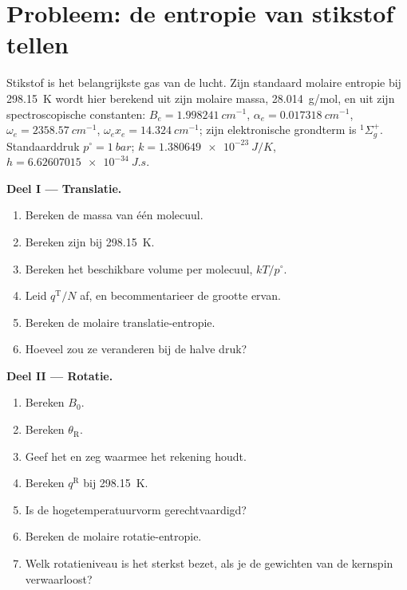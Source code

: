 \section{Probleem: de entropie van stikstof tellen}

\begin{problem}
\label{pb:b3:partition-functions:1}
Stikstof is het belangrijkste gas van de lucht. Zijn standaard molaire
entropie bij
\qty{298.15}{K} wordt hier berekend uit zijn molaire massa,
\qty{28.014}{g/mol}, en uit zijn spectroscopische constanten: $B_e = \qty{1.998241}{cm^{-1}}$, $\alpha_e = \qty{0.017318}{cm^{-1}}$, $\omega_e =
\qty{2358.57}{cm^{-1}}$, $\omega_ex_e = \qty{14.324}{cm^{-1}}$; zijn
elektronische grondterm is ${}^1\Sigma_g^+$.
Standaarddruk $p^\circ = \qty{1}{bar}$; $k = \qty{1.380649e-23}{J/K}$, $h = \qty{6.62607015e-34}{J.s}$.

\medskip\noindent\textbf{Deel I --- Translatie.}
\begin{enumerate}
  \item Bereken de massa van één molecuul.
  \item Bereken zijn  bij \qty{298.15}{K}.
  \item Bereken het beschikbare volume per molecuul, $kT/p^\circ$.
  \item Leid $q^{\mathrm T}/N$ af, en becommentarieer de grootte ervan.
  \item Bereken de molaire translatie-entropie.
  \item Hoeveel zou ze veranderen bij de halve druk?
\end{enumerate}

\medskip\noindent\textbf{Deel II --- Rotatie.}
\begin{enumerate}[resume]
  \item Bereken $B_0$.
  \item Bereken $\theta_{\mathrm R}$.
  \item Geef het  en zeg waarmee het rekening houdt.
  \item Bereken $q^{\mathrm R}$ bij \qty{298.15}{K}.
  \item Is de hogetemperatuurvorm gerechtvaardigd?
  \item Bereken de molaire rotatie-entropie.
  \item Welk rotatieniveau is het sterkst bezet, als je de gewichten van de
        kernspin verwaarloost?
\end{enumerate}


\end{problem}
